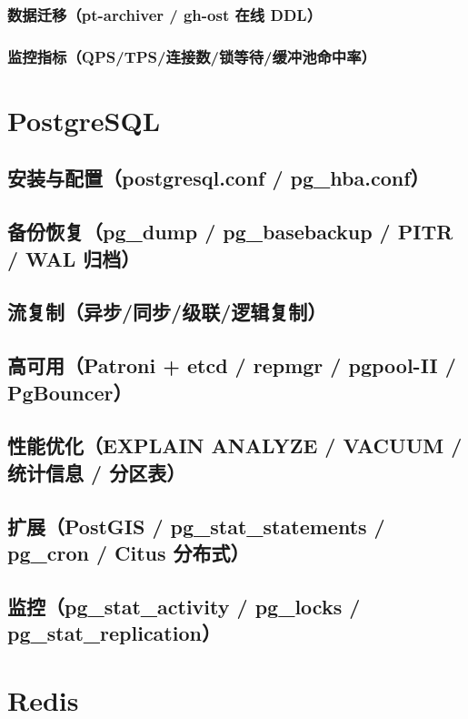 \documentclass[12pt,UTF8]{ctexbook}
\begin{document}
    \subsection{数据迁移（pt-archiver / gh-ost 在线 DDL）}
    \subsection{监控指标（QPS/TPS/连接数/锁等待/缓冲池命中率）}

\chapter{PostgreSQL}
\label{chap:postgresql}

  \section{安装与配置（postgresql.conf / pg\_hba.conf）}
  \section{备份恢复（pg\_dump / pg\_basebackup / PITR / WAL 归档）}
  \section{流复制（异步/同步/级联/逻辑复制）}
  \section{高可用（Patroni + etcd / repmgr / pgpool-II / PgBouncer）}
  \section{性能优化（EXPLAIN ANALYZE / VACUUM / 统计信息 / 分区表）}
  \section{扩展（PostGIS / pg\_stat\_statements / pg\_cron / Citus 分布式）}
  \section{监控（pg\_stat\_activity / pg\_locks / pg\_stat\_replication）}

\chapter{Redis}
\label{chap:redis}
\end{document}
